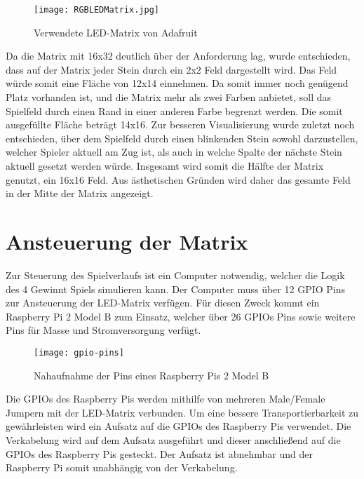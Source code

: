 \begin{figure}[!hbt]
	\centering
	\texttt{[image: RGBLEDMatrix.jpg]}
	\caption{Verwendete LED-Matrix von Adafruit}
\end{figure}

Da die Matrix mit 16x32 deutlich über der Anforderung lag, wurde entschieden, dass auf der Matrix jeder Stein durch ein 2x2 Feld  dargestellt wird.
Das Feld würde somit eine Fläche von 12x14 einnehmen. Da somit immer noch genügend Platz vorhanden ist, und die Matrix mehr als zwei Farben anbietet, soll das Spielfeld durch einen Rand in einer anderen Farbe begrenzt werden.
Die somit ausgefüllte Fläche beträgt 14x16.
Zur besseren Visualisierung wurde zuletzt noch entschieden, über dem Spielfeld durch einen blinkenden Stein sowohl darzustellen, welcher Spieler aktuell am Zug ist, als auch in welche Spalte der nächste Stein aktuell gesetzt werden würde.
Insgesamt wird somit die Hälfte der Matrix genutzt, ein 16x16 Feld.
Aus ästhetischen Gründen wird daher das gesamte Feld in der Mitte der Matrix angezeigt.

\section{Ansteuerung der Matrix}
Zur Steuerung des Spielverlaufs ist ein Computer notwendig, welcher die Logik des 4 Gewinnt Spiels simulieren kann. Der Computer muss über 12 GPIO Pins zur Ansteuerung der LED-Matrix verfügen. Für diesen Zweck kommt ein \glqq Raspberry Pi 2 Model B\grqq{} zum Einsatz, welcher über 26 GPIOs Pins sowie weitere Pins für Masse und Stromversorgung verfügt.

\begin{figure}[!hbt]
	\centering
	\texttt{[image: gpio-pins]}
	\caption{Nahaufnahme der Pins eines Raspberry Pis 2 Model B}
\end{figure}

Die GPIOs des Raspberry Pis werden mithilfe von mehreren Male/Female Jumpern mit der LED-Matrix verbunden. Um eine bessere Transportierbarkeit zu gewährleisten wird ein Aufsatz auf die GPIOs des Raspberry Pis verwendet. Die Verkabelung wird auf dem Aufsatz ausgeführt und dieser anschließend auf die GPIOs des Raspberry Pis gesteckt. Der Aufsatz ist abnehmbar und der Raspberry Pi somit unabhängig von der Verkabelung.

